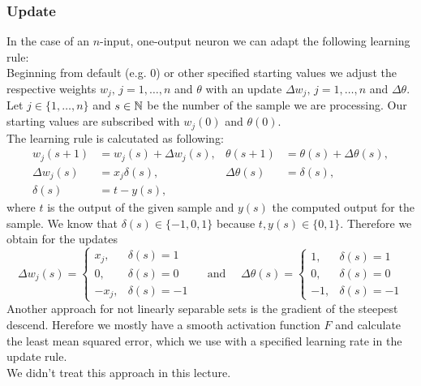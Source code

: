 \subsubsection*{Update}
In the case of an $n$-input, one-output neuron we can adapt the following learning rule:\\
Beginning from default (e.g. 0) or other specified starting values we adjust the respective weights $w_j,\,j=1,\hdots,n$ and $\theta$ with an update $\Delta w_j,\,j=1,\hdots,n$ and $\Delta \theta$.\\
Let $j\in\{1,\hdots,n\}$ and $s\in\mathbb{N}$ be the number of the sample we are processing. Our starting values are subscribed with $w_j(0)$ and $\theta(0)$.\\
The learning rule is calcutated as following:
\begin{align*}
w_j(s+1) &= w_j(s) + \Delta w_j(s), & \theta(s+1) &= \theta(s) + \Delta \theta(s), \\
\Delta w_j(s) &= x_j\delta(s), & \Delta \theta(s) &= \delta(s), \\
\delta(s) &= t-y(s),
\end{align*}
where $t$ is the output of the given sample and $y(s)$ the computed output for the sample. We know that $\delta(s)\in\{-1,0,1\}$ because $t,y(s)\in\{0,1\}$. Therefore we obtain for the updates
\[ \Delta w_j(s)=\begin{cases}
	x_j, &\delta(s)=1 \\
	0, &\delta(s)=0 \\
	-x_j, &\delta(s)=-1
\end{cases}\quad \text{ and }\quad \Delta \theta(s)=\begin{cases}
	1, &\delta(s)=1 \\
	0, &\delta(s)=0 \\
	-1, &\delta(s)=-1
\end{cases} \]
Another approach for not linearly separable sets is the gradient of the steepest descend. Herefore we mostly have a smooth activation function $F$ and calculate the least mean squared error, which we use with a specified learning rate in the update rule.\\
We didn't treat this approach in this lecture.



